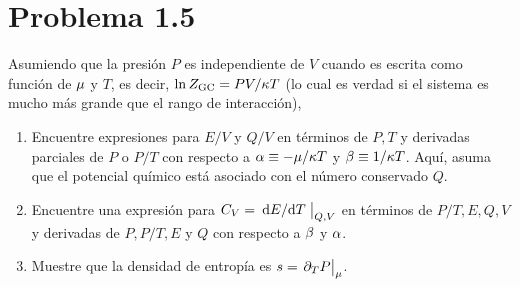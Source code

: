 \section{Problema 1.5}
\begin{tcolorbox}
\begin{problema}
Asumiendo que la presión $P$ es independiente de $V$ cuando es escrita como función de $\mu$ y $T$, es decir, $\ln Z_{\rm GC}=PV/\kappa T$ (lo cual es verdad si el sistema es mucho más grande que el rango de interacción),
\begin{enumerate}
	\item Encuentre expresiones para $E/V$ y $Q/V$ en términos de $P,T$ y derivadas parciales de $P$ o $P/T$ con respecto a $\alpha\equiv-\mu/\kappa T$ y $\beta\equiv 1/\kappa T$. Aquí, asuma que el potencial químico está asociado con el número conservado $Q$.
	\item Encuentre una expresión para $C_V=\eval{\dv*{E}{T}}_{Q,V}$ en términos de $P/T,E,Q,V$ y derivadas de $P,P/T,E$ y $Q$ con respecto a $\beta$ y $\alpha$.
	\item Muestre que la densidad de entropía es $s=\eval{{\partial_T P}}_\m $.
\end{enumerate}
\end{problema}
\end{tcolorbox}

